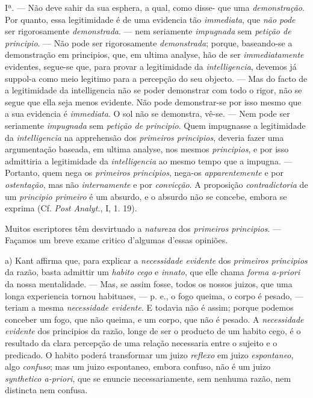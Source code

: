 Iª. --- Não deve sahir da sua esphera, a qual, como disse- que uma \emph{demonstração}. Por quanto, essa legitimidade é de uma evidencia tão \emph{immediata}, que \emph{não pode} ser rigorosamente \emph{demonstrada}. --- nem seriamente \emph{impugnada} sem \emph{petição de principio}. --- Não pode ser rigorosamente \emph{demonstrada}; porque, baseando-se a demonstração em principios, que, em ultima analyse, hão de ser \emph{immediatamente} evidentes, segue-se que, para provar a legitimidade da \emph{intelligencia}, devemos já suppol-a como meio legitimo para a percepção do seu objecto. --- Mas do facto de a legitimidade da intelligencia não se poder demonstrar com todo o rigor, não se segue que ella seja menos evidente. Não pode demonstrar-se por isso mesmo que a sua evidencia é \emph{immediata}. O sol não se demonstra, vê-se. --- Nem pode ser seriamente \emph{impugnada} sem \emph{petição de principio}. Quem impugnasse a legitimidade da \emph{intelligencia} na apprehensão dos \emph{primeiros principios}, deveria fazer uma argumentação baseada, em ultima analyse, nos mesmos \emph{principios}, e por isso admittiria a legitimidade da \emph{intelligencia} ao mesmo tempo que a impugna. --- Portanto, quem nega os \emph{primeiros principios}, nega-os \emph{apparentemente} e por \emph{ostentação}, mas não \emph{internamente} e por \emph{convicção}. A proposição \emph{contradictoria} de um \emph{principio primeiro} é um absurdo, e o absurdo não se concebe, embora se exprima (Cf. \emph{Post Analyt.}, I, 1. 19).

Muitos escriptores têm desvirtuado a \emph{natureza} dos \emph{primeiros principios}. --- Façamos um breve exame critico d'algumas d'essas opiniões.

a) Kant affirma que, para explicar a \emph{necessidade evidente} dos \emph{primeiros principios} da razão, basta admittir um \emph{habito cego} e \emph{innato}, que elle chama \emph{forma a-priori} da nossa mentalidade. --- Mas, se assim fosse, todos os nossos juizos, que uma longa experiencia tornou habituaes, --- p. e., o fogo queima, o corpo é pesado, --- teriam a mesma \emph{necessidade evidente}. E todavia não é assim; porque podemos conceber um fogo, que não queima, e um corpo, que não é pesado. A \emph{necessidade evidente} dos principios da razão, longe de ser o producto de um habito cego, é o resultado da clara percepção de uma relação necessaria entre o sujeito e o predicado. O habito poderá transformar um juizo \emph{reflexo} em juizo \emph{espontaneo}, algo \emph{confuso}; mas um juizo espontaneo, embora confuso, não é um juizo \emph{synthetico a-priori}, que se enuncie necessariamente, sem nenhuma razão, nem distincta nem confusa.

